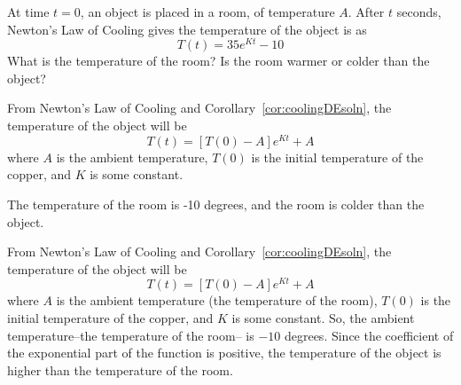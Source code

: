 \begin{question}
At time $t=0$, an object is placed in a room, of temperature $A$. After $t$ seconds, Newton's Law of Cooling gives the temperature of the object is as
\[T(t)=35e^{Kt}-10\]
What is the temperature of the room? Is the room warmer or colder than the object?
\end{question}
\begin{hint}
From Newton's Law of Cooling and Corollary~\ref*{cor:coolingDEsoln}, the temperature of the object will be
\[T(t)=[T(0)-A]e^{Kt}+A\]
where $A$ is the ambient temperature, $T(0)$ is the initial temperature of the copper, and $K$ is some constant.
\end{hint}
\begin{answer}
The temperature of the room is -10 degrees, and the room is colder than the object.
\end{answer}
\begin{solution}
From Newton's Law of Cooling and Corollary~\ref*{cor:coolingDEsoln}, the temperature of the object will be
\[T(t)=[T(0)-A]e^{Kt}+A\]
where $A$ is the ambient temperature (the temperature of the room), $T(0)$ is the initial temperature of the copper, and $K$ is some constant. So, the ambient temperature--the temperature of the room-- is $-10$ degrees. Since the coefficient of the exponential part of the function is positive, the temperature of the object is higher than the temperature of the room.
\end{solution}




